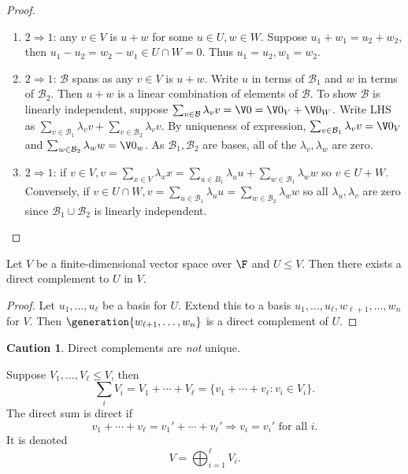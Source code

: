 \documentclass[a4paper]{article}
\newcommand*{\basis}{\mathcal}
\theoremstyle{definition}
\newtheorem*{caution}{Caution}
\begin{document}
\begin{proof}\leavevmode
  \begin{enumerate}
  \item \(2 \Rightarrow 1\): any \(v\in V\) is \(u+w\) for some \(u\in U, w\in W\). Suppose \(u_1+w_1=u_2+w_2\), then \(u_1-u_2 = w_2-w_1 \in U\cap W = 0\). Thus \(u_1=u_2,w_1=w_2\).
  \item \(2 \Rightarrow 1\): \(\basis B\) spans as any \(v\in V\) is \(u+w\). Write \(u\) in terms of \(\basis B_1\) and \(w\) in terms of \(\basis B_2\). Then \(u+w\) is a linear combination of elements of \(\basis B\). To show \(\basis B\) is linearly independent, suppose \(\sum_{v\in \basis B} \lambda_v v = \V 0 = \V 0_V + \V 0_W\). Write LHS as \(\sum_{v\in \basis B_1} \lambda_vv + \sum_{v\in \basis B_2}\lambda_vv\). By uniqueness of expression, \(\sum_{v\in \basis B_1}\lambda_vv=\V 0_V\) and \(\sum_{w\in \basis B_2}\lambda_ww=\V 0_w\). As \(\basis B_1, \basis B_2\) are bases, all of the \(\lambda_v, \lambda_w\) are zero.
  \item \(2 \Rightarrow 1\): if \(v\in V, v=\sum_{x\in V}\lambda_xx = \sum_{u\in B_1}\lambda_uu + \sum_{w\in \basis B_1}\lambda_ww\) so \(v\in U+W\). Conversely, if \(v\in U\cap W, v = \sum_{u\in \basis B_1}\lambda_uu=\sum_{w\in \basis B_2}\lambda_ww\) so all \(\lambda_u, \lambda_v\) are zero since \(\basis B_1\cup \basis B_2\) is linearly independent.
  \end{enumerate}
\end{proof}

\begin{lemma}
  Let \(V\) be a finite-dimensional vector space over \(\F\) and \(U\leq V\). Then there exists a direct complement to \(U\) in \(V\).
\end{lemma}

\begin{proof}
  Let \(u_1,\ldots, u_\ell\) be a basis for \(U\). Extend this to a basis \(u_1,\ldots, u_\ell,w_{\ell+1},\ldots,w_n\) for \(V\). Then \(\generation{w_{\ell+1},\ldots,w_n}\) is a direct complement of \(U\).
\end{proof}

\begin{caution}
  Direct complements are \emph{not} unique.
\end{caution}

\begin{definition}
  Suppose \(V_1,\ldots, V_\ell \leq V\), then
  \[
\sum_i V_i = V_1+\cdots+V_\ell = \{v_1+\cdots+v_\ell: v_i\in V_i\}.
  \]
  The direct sum is direct if
  \[
    v_1+\cdots+v_\ell = v_1'+\cdots+ v_\ell' \Rightarrow v_i = v_i' \text{ for all } i.
  \]
  It is denoted
  \[
V = \bigoplus_{i=1}^\ell V_i.
  \]
\end{definition}
\end{document}
